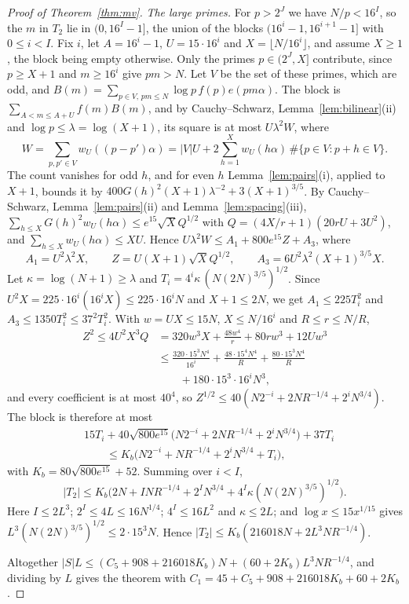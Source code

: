 \documentclass[12pt]{amsart}
\theoremstyle{remark}
\begin{document}
\begin{proof}[Proof of Theorem~\ref{thm:mv}]
\emph{The large primes.} For $p>2^J$ we have $N/p<16^I$, so the $m$ in $T_2$ lie in
$(0,16^I-1]$, the union of the blocks $(16^i-1,16^{i+1}-1]$ with $0\le i<I$. Fix $i$, let
$A=16^i-1$, $U=15\cdot16^i$ and $X=\lfloor N/16^i\rfloor$, and assume $X\ge1$, the block being
empty otherwise. Only the primes $p\in(2^J,X]$ contribute, since $p\ge X+1$ and $m\ge16^i$ give
$pm>N$. Let $V$ be the set of these primes, which are odd, and
$B(m)=\sum_{p\in V,\,pm\le N}\log p\,f(p)e(pm\alpha)$. The block is
$\sum_{A<m\le A+U}f(m)B(m)$, and by Cauchy--Schwarz, Lemma~\ref{lem:bilinear}(ii) and
$\log p\le\lambda=\log(X+1)$, its square is at most $U\lambda^2W$, where
\[
  W=\sum_{p,p'\in V}w_U((p-p')\alpha)=|V|U+2\sum_{h=1}^Xw_U(h\alpha)\,\#\{p\in V:p+h\in V\}.
\]
The count vanishes for odd $h$, and for even $h$ Lemma~\ref{lem:pairs}(i), applied to $X+1$,
bounds it by $400G(h)^2(X+1)\lambda^{-2}+3(X+1)^{3/5}$. By Cauchy--Schwarz,
Lemma~\ref{lem:pairs}(ii) and Lemma~\ref{lem:spacing}(iii),
$\sum_{h\le X}G(h)^2w_U(h\alpha)\le e^{15}\sqrt XQ^{1/2}$ with $Q=(4X/r+1)(20rU+3U^2)$, and
$\sum_{h\le X}w_U(h\alpha)\le XU$. Hence $U\lambda^2W\le A_1+800e^{15}Z+A_3$, where
\[
  A_1=U^2\lambda^2X,\qquad Z=U(X+1)\sqrt XQ^{1/2},\qquad A_3=6U^2\lambda^2(X+1)^{3/5}X.
\]
Let $\kappa=\log(N+1)\ge\lambda$ and $T_i=4^i\kappa\,(N(2N)^{3/5})^{1/2}$. Since
$U^2X=225\cdot16^i(16^iX)\le225\cdot16^iN$ and $X+1\le2N$, we get $A_1\le225T_i^2$ and
$A_3\le1350T_i^2\le37^2T_i^2$. With $w=UX\le15N$, $X\le N/16^i$ and $R\le r\le N/R$,
\begin{align*}
  Z^2\le4U^2X^3Q&=320w^3X+\frac{48w^4}r+80rw^3+12Uw^3\\
  &\le\frac{320\cdot15^3N^4}{16^i}+\frac{48\cdot15^4N^4}R+\frac{80\cdot15^3N^4}R\\
  &\qquad+180\cdot15^3\cdot16^iN^3,
\end{align*}
and every coefficient is at most $40^4$, so $Z^{1/2}\le40(N2^{-i}+2NR^{-1/4}+2^iN^{3/4})$. The
block is therefore at most
\begin{align*}
  &15T_i+40\sqrt{800e^{15}}\bigl(N2^{-i}+2NR^{-1/4}+2^iN^{3/4}\bigr)+37T_i\\
  &\qquad\le K_b\bigl(N2^{-i}+NR^{-1/4}+2^iN^{3/4}+T_i\bigr),
\end{align*}
with $K_b=80\sqrt{800e^{15}}+52$. Summing over $i<I$,
\[
  |T_2|\le K_b\bigl(2N+INR^{-1/4}+2^IN^{3/4}+4^I\kappa(N(2N)^{3/5})^{1/2}\bigr).
\]
Here $I\le2L^3$; $2^I\le4L\le16N^{1/4}$; $4^I\le16L^2$ and $\kappa\le2L$; and
$\log x\le15x^{1/15}$ gives $L^3(N(2N)^{3/5})^{1/2}\le2\cdot15^3N$. Hence
$|T_2|\le K_b(216018N+2L^3NR^{-1/4})$.

Altogether $|S|L\le(C_5+908+216018K_b)N+(60+2K_b)L^3NR^{-1/4}$, and dividing by $L$ gives the
theorem with $C_1=45+C_5+908+216018K_b+60+2K_b$.
\end{proof}
\end{document}
